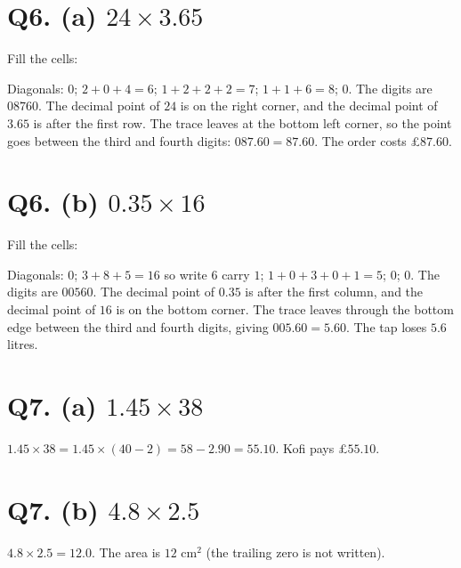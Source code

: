 \documentclass[12pt,a4paper]{article}
\newcommand{\lsetup}[2]{%
  \edef\lC{\the\numexpr#1\relax}\edef\lR{\the\numexpr#2\relax}%
  \edef\lCm{\the\numexpr#1-1\relax}\edef\lRm{\the\numexpr#2-1\relax}}
\newcommand{\lgrid}{%
  \draw[thick] (0,0) rectangle (\lC,\lR);
  \foreach \i in {1,...,\lCm}{\draw (\i,0) -- (\i,\lR);}
  \foreach \j in {1,...,\lRm}{\draw (0,\j) -- (\lC,\j);}
  \foreach \i in {1,...,\lC}{\foreach \j in {1,...,\lR}{%
    \draw[gray!75] ({\i-1},{\j-1}) -- (\i,\j);}}}
\newcommand{\ltop}[2]{\node[font=\small] at ({#1-0.5},{\lR+0.34}) {#2};}
\newcommand{\lside}[2]{\node[font=\small] at ({\lC+0.34},{\lR-#1+0.5}) {#2};}
\newcommand{\lcell}[4]{%
  \node[font=\small] at ({#1-0.72},{\lR-#2+0.70}) {#3};
  \node[font=\small] at ({#1-0.28},{\lR-#2+0.30}) {#4};}
\newcommand{\lleft}[2]{\node[font=\small] at (-0.44,{\lR-#1+0.5}) {#2};}
\newcommand{\lbot}[2]{\node[font=\small] at ({#1-0.5},-0.42) {#2};}
\newcommand{\ltopdot}[1]{\fill (#1,{\lR+0.2}) circle (1.8pt);}
\newcommand{\lsidedot}[1]{\fill ({\lC+0.34},{\lR-#1}) circle (1.8pt);}
\newcommand{\lmeet}[2]{%
  \pgfmathsetmacro{\lmx}{#1}%
  \pgfmathsetmacro{\lmy}{\lR-#2}%
  \pgfmathsetmacro{\lts}{min(\lmx,\lmy)}%
  \pgfmathsetmacro{\lex}{\lmx-\lts}%
  \pgfmathsetmacro{\ley}{\lmy-\lts}%
  \pgfmathsetmacro{\ldx}{\lex<0.5 ? -0.44 : \lex}%
  \pgfmathsetmacro{\ldy}{\ley<0.5 ? -0.42 : \ley}}
\newcommand{\ltrace}[2]{\lmeet{#1}{#2}%
  \draw[red!75!black,dashed,-{Stealth[length=2mm]}] ({\lmx},{\lR+0.1}) -- ({\lmx},{\lmy});
  \draw[red!75!black,dashed,-{Stealth[length=2mm]}] ({\lC+0.12},{\lmy}) -- ({\lmx},{\lmy});
  \ifdim\lts pt>0.1pt
    \draw[red!75!black,dashed,thick,-{Stealth[length=2mm]}] ({\lmx},{\lmy}) -- ({\lex},{\ley});
  \fi
  \fill[red!75!black] ({\ldx},{\ldy}) circle (2.1pt);}
\begin{document}
\section*{Q6. (a) $24\times3.65$}
Fill the cells:
\begin{center}
\end{center}
Diagonals: $0$; $2+0+4=6$; $1+2+2+2=7$; $1+1+6=8$; $0$. The digits are $08760$. The decimal point of $24$ is on the right corner, and the decimal point of $3.65$ is after the first row. The trace leaves at the bottom left corner, so the point goes between the third and fourth digits: $087.60=87.60$. The order costs £$87.60$.

\section*{Q6. (b) $0.35\times16$}
Fill the cells:
\begin{center}
\end{center}
Diagonals: $0$; $3+8+5=16$ so write $6$ carry $1$; $1+0+3+0+1=5$; $0$; $0$. The digits are $00560$. The decimal point of $0.35$ is after the first column, and the decimal point of $16$ is on the bottom corner. The trace leaves through the bottom edge between the third and fourth digits, giving $005.60=5.60$. The tap loses $5.6$ litres.

\section*{Q7. (a) $1.45\times38$}
$1.45\times38 = 1.45\times(40-2) = 58 - 2.90 = 55.10$. Kofi pays £$55.10$.

\section*{Q7. (b) $4.8\times2.5$}
$4.8\times2.5 = 12.0$. The area is $12$ cm$^2$ (the trailing zero is not written).
\end{document}
